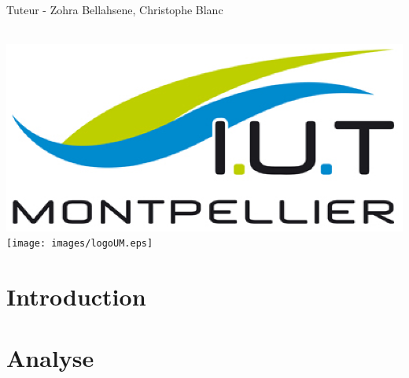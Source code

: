 \documentclass[a4paper, 12pt]{report}
\title{Pre-Rapport de Projet \large \vskip 1ex Open Nutrition}
\author{
    Yohan {Liebart} |
    Abdel {Ait Abdelloili} |
    Gabriel {Laurens}
}
\date{\today}
\begin{document}
\makeatletter
  \begin{titlepage}
  \centering

        {\LARGE \@title} \\
    	\vspace{2em}
        {\large \@author} \\
        \vspace{1em}
        Tuteur - Zohra Bellahsene, Christophe Blanc
		    	
    	\vspace{3em}
          {\large \@date}\\
    \vfill
        \includegraphics[height=0.15\textheight]{images/logoIUT.eps}
        \hfill
        \texttt{[image: images/logoUM.eps]}
  \end{titlepage}
\makeatother

\tableofcontents

\chapter{Introduction}


\chapter{Analyse}


%

%

%

%

%
%


%
\end{document}
